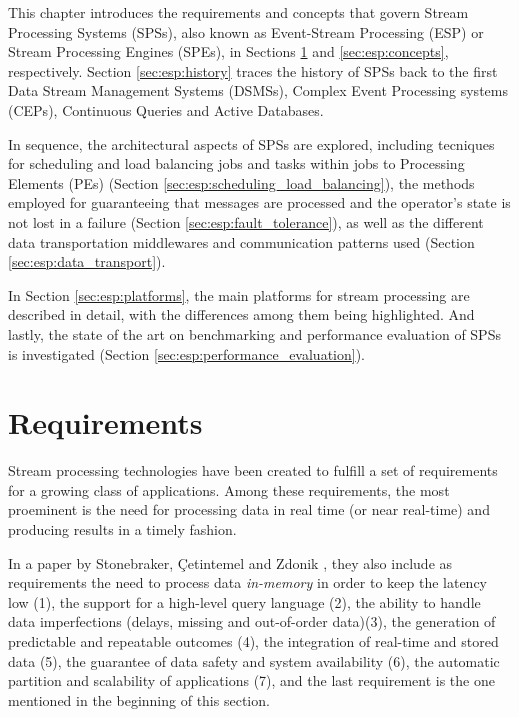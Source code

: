 \documentclass[ppgc,diss,english]{iiufrgs}
\begin{document}
This chapter introduces the requirements and concepts that govern Stream Processing Systems (SPSs), also known as Event-Stream Processing (ESP) or Stream Processing Engines (SPEs), in Sections \ref{sec:esp:requirements} and \ref{sec:esp:concepts}, respectively. Section \ref{sec:esp:history} traces the history of SPSs back to the first Data Stream Management Systems (DSMSs), Complex Event Processing systems (CEPs), Continuous Queries and Active Databases.

In sequence, the architectural aspects of SPSs are explored, including tecniques for scheduling and load balancing jobs and tasks within jobs to Processing Elements (PEs) (Section \ref{sec:esp:scheduling_load_balancing}), the methods employed for guaranteeing that messages are processed and the operator's state is not lost in a failure (Section \ref{sec:esp:fault_tolerance}), as well as the different data transportation middlewares and communication patterns used (Section \ref{sec:esp:data_transport}).

In Section \ref{sec:esp:platforms}, the main platforms for stream processing are described in detail, with the differences among them being highlighted. And lastly, the state of the art on benchmarking and performance evaluation of SPSs is investigated (Section \ref{sec:esp:performance_evaluation}).

\section{Requirements}
\label{sec:esp:requirements}

Stream processing technologies have been created to fulfill a set of requirements for a growing class of applications. Among these requirements, the most proeminent is the need for processing data in real time (or near real-time) and producing results in a timely fashion.

In a paper by Stonebraker, {\c{C}}etintemel and Zdonik \cite{stonebraker20058}, they also include as requirements the need to process data \emph{in-memory} in order to keep the latency low (1), the support for a high-level query language (2), the ability to handle data imperfections (delays, missing and out-of-order data)(3), the generation of predictable and repeatable outcomes (4), the integration of real-time and stored data (5), the guarantee of data safety and system availability (6), the automatic partition and scalability of applications (7), and the last requirement is the one mentioned in the beginning of this section.
\end{document}
